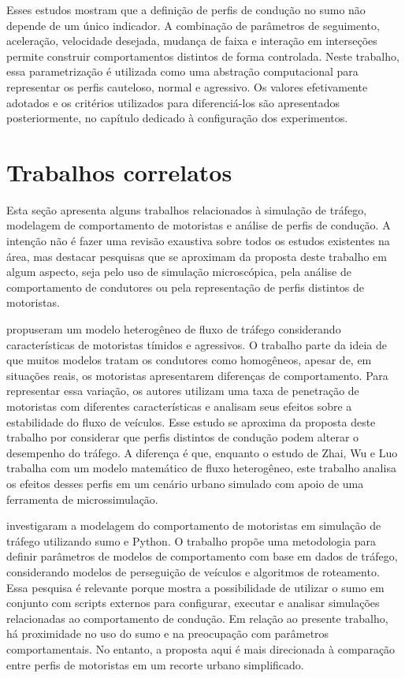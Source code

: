 Esses estudos mostram que a definição de perfis de condução no \gls{sumo} não depende de um único indicador. A combinação de parâmetros de seguimento, aceleração, velocidade desejada, mudança de faixa e interação em interseções permite construir comportamentos distintos de forma controlada. Neste trabalho, essa parametrização é utilizada como uma abstração computacional para representar os perfis cauteloso, normal e agressivo. Os valores efetivamente adotados e os critérios utilizados para diferenciá-los são apresentados posteriormente, no capítulo dedicado à configuração dos experimentos.

\section{Trabalhos correlatos}

Esta seção apresenta alguns trabalhos relacionados à simulação de tráfego, modelagem de comportamento de motoristas e análise de perfis de condução. A intenção não é fazer uma revisão exaustiva sobre todos os estudos existentes na área, mas destacar pesquisas que se aproximam da proposta deste trabalho em algum aspecto, seja pelo uso de simulação microscópica, pela análise de comportamento de condutores ou pela representação de perfis distintos de motoristas.

 propuseram um modelo heterogêneo de fluxo de tráfego considerando características de motoristas tímidos e agressivos. O trabalho parte da ideia de que muitos modelos tratam os condutores como homogêneos, apesar de, em situações reais, os motoristas apresentarem diferenças de comportamento. Para representar essa variação, os autores utilizam uma taxa de penetração de motoristas com diferentes características e analisam seus efeitos sobre a estabilidade do fluxo de veículos. Esse estudo se aproxima da proposta deste trabalho por considerar que perfis distintos de condução podem alterar o desempenho do tráfego. A diferença é que, enquanto o estudo de Zhai, Wu e Luo trabalha com um modelo matemático de fluxo heterogêneo, este trabalho analisa os efeitos desses perfis em um cenário urbano simulado com apoio de uma ferramenta de microssimulação.

 investigaram a modelagem do comportamento de motoristas em simulação de tráfego utilizando \gls{sumo} e Python. O trabalho propõe uma metodologia para definir parâmetros de modelos de comportamento com base em dados de tráfego, considerando modelos de perseguição de veículos e algoritmos de roteamento. Essa pesquisa é relevante porque mostra a possibilidade de utilizar o \gls{sumo} em conjunto com scripts externos para configurar, executar e analisar simulações relacionadas ao comportamento de condução. Em relação ao presente trabalho, há proximidade no uso do \gls{sumo} e na preocupação com parâmetros comportamentais. No entanto, a proposta aqui é mais direcionada à comparação entre perfis de motoristas em um recorte urbano simplificado.

